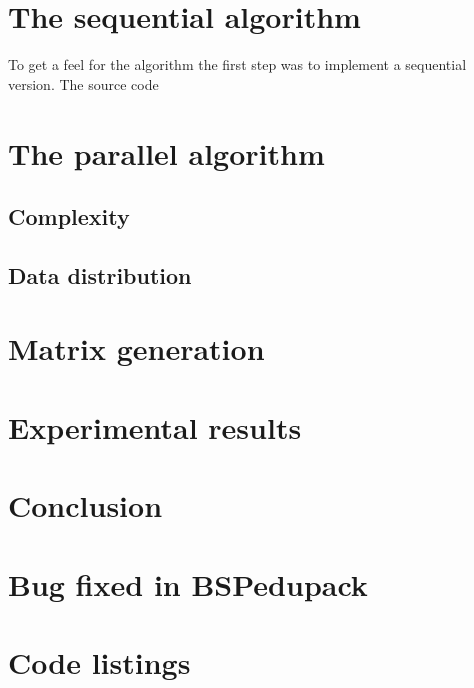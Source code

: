 \documentclass[a4paper]{article}
\begin{document}
\section{The sequential algorithm}

To get a feel for the algorithm the first step was to implement a sequential version. The source code 

\section{The parallel algorithm}

\subsection{Complexity}

\subsection{Data distribution}

\section{Matrix generation}


\section{Experimental results}


\section{Conclusion}


\appendix

\section{Bug fixed in BSPedupack}


\section{Code listings}




\end{document}
